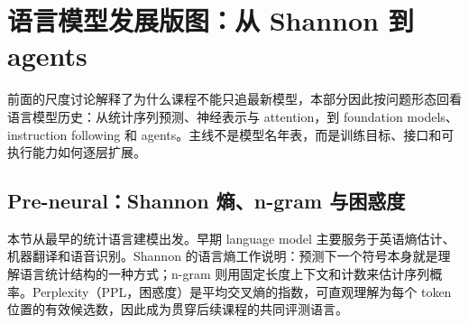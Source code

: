 \section{语言模型发展版图：从 Shannon 到 agents}

前面的尺度讨论解释了为什么课程不能只追最新模型，本部分因此按问题形态回看语言模型历史：从统计序列预测、神经表示与 attention，到 foundation models、instruction following 和 agents。主线不是模型名年表，而是训练目标、接口和可执行能力如何逐层扩展。

\subsection{Pre-neural：Shannon 熵、n-gram 与困惑度}

本节从最早的统计语言建模出发。早期 language model 主要服务于英语熵估计、机器翻译和语音识别。Shannon 的语言熵工作说明：预测下一个符号本身就是理解语言统计结构的一种方式；n-gram 则用固定长度上下文和计数来估计序列概率。Perplexity（PPL，困惑度）是平均交叉熵的指数，可直观理解为每个 token 位置的有效候选数，因此成为贯穿后续课程的共同评测语言。

